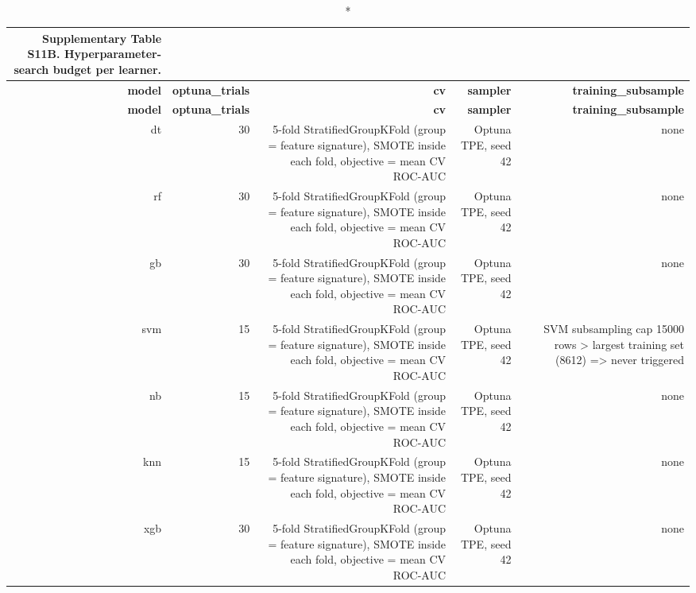 \documentclass[10pt]{article}
\begin{document}
\tiny
\setlength{\tabcolsep}{2pt}
\begin{longtable}{rrrrr}
\caption*{\textbf{Supplementary Table S11B.} Hyperparameter-search budget per learner.}\\
\toprule
\textbf{model} & \textbf{optuna\_trials} & \textbf{cv} & \textbf{sampler} & \textbf{training\_subsample} \\
\midrule
\endfirsthead
\toprule
\textbf{model} & \textbf{optuna\_trials} & \textbf{cv} & \textbf{sampler} & \textbf{training\_subsample} \\
\midrule
\endhead
\bottomrule
\endfoot
dt & 30 & 5-fold StratifiedGroupKFold (group = feature signature), SMOTE inside each fold, objective = mean CV ROC-AUC & Optuna TPE, seed 42 & none \\
rf & 30 & 5-fold StratifiedGroupKFold (group = feature signature), SMOTE inside each fold, objective = mean CV ROC-AUC & Optuna TPE, seed 42 & none \\
gb & 30 & 5-fold StratifiedGroupKFold (group = feature signature), SMOTE inside each fold, objective = mean CV ROC-AUC & Optuna TPE, seed 42 & none \\
svm & 15 & 5-fold StratifiedGroupKFold (group = feature signature), SMOTE inside each fold, objective = mean CV ROC-AUC & Optuna TPE, seed 42 & SVM subsampling cap 15000 rows > largest training set (8612) => never triggered \\
nb & 15 & 5-fold StratifiedGroupKFold (group = feature signature), SMOTE inside each fold, objective = mean CV ROC-AUC & Optuna TPE, seed 42 & none \\
knn & 15 & 5-fold StratifiedGroupKFold (group = feature signature), SMOTE inside each fold, objective = mean CV ROC-AUC & Optuna TPE, seed 42 & none \\
xgb & 30 & 5-fold StratifiedGroupKFold (group = feature signature), SMOTE inside each fold, objective = mean CV ROC-AUC & Optuna TPE, seed 42 & none \\
\bottomrule
\end{longtable}
\normalsize
\end{document}
